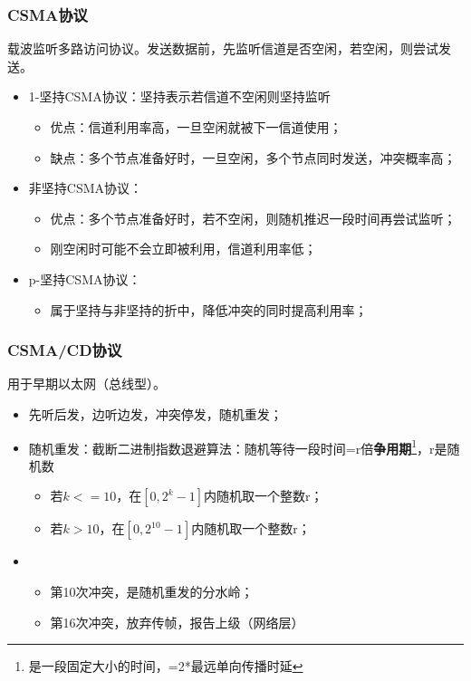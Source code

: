 \subsubsection{CSMA协议}
载波监听多路访问协议。发送数据前，先监听信道是否空闲，若空闲，则尝试发送。
\begin{itemize}
    \item 1-坚持CSMA协议：坚持表示若信道不空闲则坚持监听\begin{itemize}
        \item 优点：信道利用率高，一旦空闲就被下一信道使用；
        \item 缺点：多个节点准备好时，一旦空闲，多个节点同时发送，冲突概率高；
    \end{itemize}
    \item 非坚持CSMA协议：\begin{itemize}
        \item 优点：多个节点准备好时，若不空闲，则随机推迟一段时间再尝试监听；
        \item 刚空闲时可能不会立即被利用，信道利用率低；
    \end{itemize}
    \item p-坚持CSMA协议：\begin{itemize}
        \item 属于坚持与非坚持的折中，降低冲突的同时提高利用率；
    \end{itemize}
\end{itemize}


\subsubsection{CSMA/CD协议}
用于早期以太网（总线型）。

\begin{itemize}
    \item 先听后发，边听边发，冲突停发，随机重发；
    \item 随机重发：截断二进制指数退避算法：随机等待一段时间=r倍\textbf{争用期}\footnote{是一段固定大小的时间，=2*最远单向传播时延}，r是随机数\begin{itemize}
        \item 若\(k <= 10\)，在\([0, 2^k - 1]\)内随机取一个整数r；
        \item 若\(k > 10\)，在\([0, 2^{10} - 1]\)内随机取一个整数r；
    \end{itemize}
    \item \begin{itemize}
        \item 第10次冲突，是随机重发的分水岭；
        \item 第16次冲突，放弃传帧，报告上级（网络层）
    \end{itemize}
\end{itemize}


